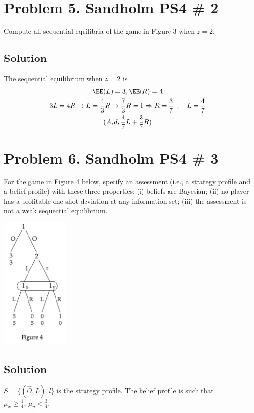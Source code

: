 \documentclass[10pt, a4paper]{article}
\begin{document}
\section*{Problem 5. Sandholm PS4 \# 2}
  Compute all sequential equilibria of the game in Figure 3 when $z=2$.
  \subsection*{Solution}
    The sequential equilibrium when $z=2$ is 
    \begin{gather*}
      \EE(L) = 3, \EE(R) = 4 \\
      3L = 4R \rightarrow L = \frac{4}{3}R \rightarrow \frac{7}{3}R = 1 \Rightarrow R = \frac{3}{7} \ \therefore \ L = \frac{4}{7} \\
      (A, d, \frac{4}{7}L + \frac{3}{7}R)
    \end{gather*}
\section*{Problem 6. Sandholm PS4 \# 3}
  For the game in Figure 4 below, specify an assessment (i.e., a strategy profile and a belief profile) with these three properties: (i) beliefs are Bayesian; (ii) no player has a profitable one-shot deviation at any information set; (iii) the assessment is not a weak sequential equilibrium.
  \begin{center}
    \includegraphics[width = 0.25\textwidth]{fig4.png}
  \end{center}
  \subsection*{Solution}
    $S = \{(\hat{O}, L), l\}$ is the strategy profile. The belief profile is such that $\mu_x \geq \frac{1}{4}, \ \mu_y < \frac{3}{4}$. 
\end{document}
